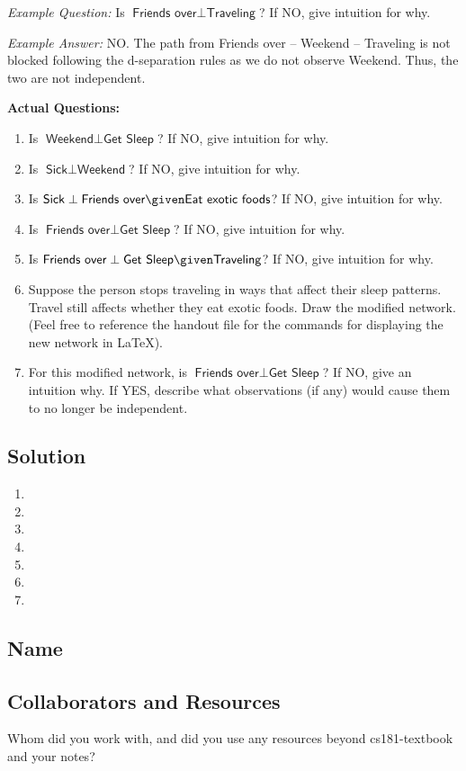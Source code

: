 \documentclass[submit]{harvardml}
\newcommand{\attr}[1]{\textsf{#1}}
\begin{document}
\begin{problem}
  \textit{Example Question:} Is $\attr{Friends over} \perp \attr{Traveling}$? If NO, give intuition for why.

  \textit{Example Answer:} NO. The path from Friends over -- Weekend -- Traveling is not blocked following the d-separation rules as we do not observe Weekend. Thus, the two are not independent. 

  \textbf{Actual Questions:}

\begin{enumerate}
\item Is $\attr{Weekend} \perp \attr{Get Sleep}$?
  If NO, give intuition for why.

\item Is $\attr{Sick} \perp \attr{Weekend}$?
  If NO, give intuition for why.


\item Is $\attr{Sick} \perp \attr{Friends over}\given \attr{Eat exotic
  foods}$? If NO, give intuition for why.


\item Is $\attr{Friends over} \perp \attr{Get Sleep}$? If NO, give
  intuition for why.

\item Is $\attr{Friends over} \perp \attr{Get Sleep} \given
  \attr{Traveling}$? If NO, give intuition for why.

\item Suppose the person stops traveling in ways that affect their
  sleep patterns.  Travel still
  affects whether they eat exotic foods.  Draw the modified network. (Feel free to reference the handout file for the commands for displaying the new network in \LaTeX).

\item For this modified network, is $\attr{Friends over} \perp
  \attr{Get Sleep}$? If NO, give an intuition why.  If YES,
  describe what observations (if any) would cause them to no longer be
  independent.

\end{enumerate}
\end{problem}

\subsection*{Solution}

\begin{enumerate}
  \item 
  \item 
  \item 
  \item 
  \item 
  \item
  \item
\end{enumerate}

\newpage


\subsection*{Name}

\subsection*{Collaborators and Resources}
Whom did you work with, and did you use any resources beyond cs181-textbook and your notes?
\end{document}
